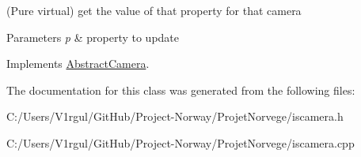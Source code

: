 (Pure virtual) get the value of that property for that camera 


\begin{DoxyParams}{Parameters}
{\em p} & property to update \\
\hline
\end{DoxyParams}


Implements \hyperlink{class_abstract_camera_acb48ab701cd02e78604a3ca1c695b1cf}{Abstract\-Camera}.



The documentation for this class was generated from the following files\-:\begin{DoxyCompactItemize}
\item 
C\-:/\-Users/\-V1rgul/\-Git\-Hub/\-Project-\/\-Norway/\-Projet\-Norvege/iscamera.\-h\item 
C\-:/\-Users/\-V1rgul/\-Git\-Hub/\-Project-\/\-Norway/\-Projet\-Norvege/iscamera.\-cpp\end{DoxyCompactItemize}
